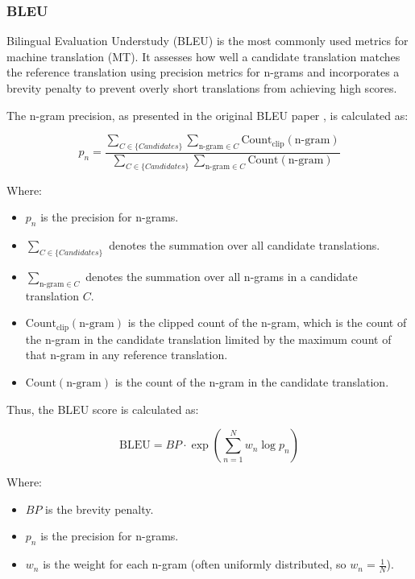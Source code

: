 \documentclass[a4paper]{article}
\begin{document}
\subsubsection{BLEU}

Bilingual Evaluation Understudy (BLEU) \cite{papieni-2002-bleu} is the most commonly used metrics for machine translation (MT). It assesses how well a candidate translation matches the reference translation using precision metrics for n-grams and incorporates a brevity penalty to prevent overly short translations from achieving high scores.

The n-gram precision, as presented in the original BLEU paper \cite{papieni-2002-bleu}, is calculated as:

\begin{equation}
    p_n = \frac{\sum_{C \in \{Candidates\}} \sum_{\text{n-gram} \in C} \text{Count}_{\text{clip}}(\text{n-gram})}{\sum_{C \in \{Candidates\}} \sum_{\text{n-gram} \in C} \text{Count}(\text{n-gram})}
\end{equation}

Where:
\begin{itemize}
    \item \( p_n \) is the precision for n-grams.
    \item \( \sum_{C \in \{Candidates\}} \) denotes the summation over all candidate translations.
    \item \( \sum_{\text{n-gram} \in C} \) denotes the summation over all n-grams in a candidate translation \( C \).
    \item \( \text{Count}_{\text{clip}}(\text{n-gram}) \) is the clipped count of the n-gram, which is the count of the n-gram in the candidate translation limited by the maximum count of that n-gram in any reference translation.
    \item \( \text{Count}(\text{n-gram}) \) is the count of the n-gram in the candidate translation.
\end{itemize}

Thus, the BLEU score is calculated as:

\begin{equation}
    \text{BLEU} = BP \cdot \exp \left( \sum_{n=1}^{N} w_n \log p_n \right)
\end{equation}

Where:
\begin{itemize}
    \item \( BP \) is the brevity penalty.
    \item \( p_n \) is the precision for n-grams.
    \item \( w_n \) is the weight for each n-gram (often uniformly distributed, so \( w_n = \frac{1}{N} \)).
\end{itemize}
\end{document}
